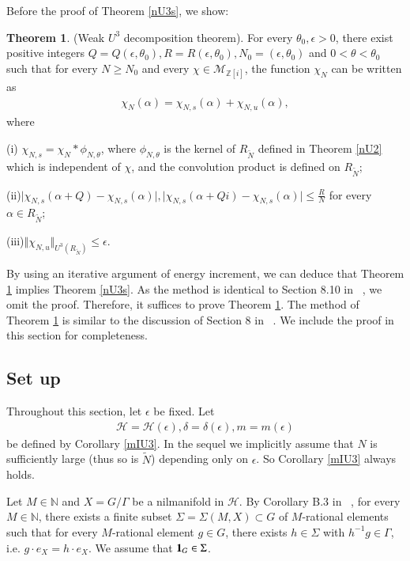 \documentclass[12pt,amstex]{amsart}
\theoremstyle{definition}
\newtheorem{thm}{Theorem}[section]
\def \Z {\mathbb{Z}[i]}
\def \A {\alpha}
\def \d {\delta}
\def \e {\epsilon}
\def \R {R_{\tilde{N}}}
\begin{document}
Before the proof of Theorem \ref{nU3s}, we show:
\begin{thm}\label{nU3w}(Weak $U^{3}$ decomposition theorem).
  For every $\theta_{0},\e>0$, there exist positive integers $Q=Q(\e,\theta_{0}),R=R(\e,\theta_{0}), N_{0}=(\e,\theta_{0})$ and $0<\theta<\theta_{0}$ such that for every $N\geq N_{0}$ and every $\chi\in\mathcal{M}_{\Z}$, the function $\chi_{N}$ can be written as
  \begin{equation}\nonumber
   \begin{split}
     \chi_{N}(\A)=\chi_{N,s}(\A)+\chi_{N,u}(\A),
   \end{split}
  \end{equation}
where

  (i) $\chi_{N,s}=\chi_{N}*\phi_{N,\theta}$, where $\phi_{N,\theta}$ is the kernel of $\R$ defined in Theorem \ref{nU2}
  which is independent of $\chi$, and the convolution product is defined on $\R$;

  (ii)$\vert\chi_{N,s}(\A+Q)-\chi_{N,s}(\A)\vert, \vert\chi_{N,s}(\A+Qi)-\chi_{N,s}(\A)\vert\leq\frac{R}{N}$ for every $\A\in\R$;

  (iii)$\Vert\chi_{N,u}\Vert_{U^{3}(\R)}\leq\e$.
\end{thm}

By using an iterative argument of energy increment, we can deduce that Theorem \ref{nU3w} implies Theorem \ref{nU3s}. As the method is identical to Section 8.10 in ~\cite{FH}, we omit the proof. Therefore, it suffices to prove Theorem \ref{nU3w}. The method of Theorem \ref{nU3w} is similar to the discussion of Section 8 in ~\cite{FH}. We include the proof in this section for completeness.





\subsection{Set up}
Throughout this section, let $\e$ be fixed. Let
  \begin{equation}\nonumber
   \begin{split}
     \mathcal{H}=\mathcal{H}(\e), \d=\d(\e), m=m(\e)
   \end{split}
  \end{equation}
be defined by Corollary \ref{mIU3}. In the sequel we implicitly assume that $N$ is sufficiently large (thus so is $\tilde{N}$) depending only on $\e$. So Corollary \ref{mIU3} always holds.

Let $M\in\mathbb{N}$ and $X=G/\Gamma$ be a nilmanifold in $\mathcal{H}$. By Corollary B.3 in ~\cite{FH}, for every $M\in\mathbb{N}$, there exists a finite subset $\Sigma=\Sigma(M,X)\subset G$ of $M$-rational elements such that for every $M$-rational element $g\in G$, there exists $h\in\Sigma$ with $h^{-1}g\in\Gamma$, i.e. $g\cdot e_{X}=h\cdot e_{X}$. We assume that $\bold{1}_{G}\in\Sigma$.
\end{document}
